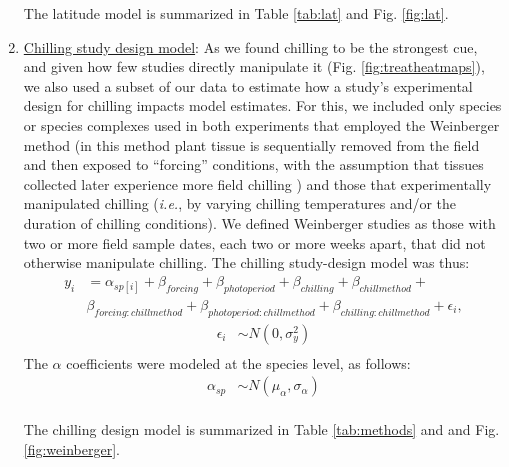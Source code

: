 \documentclass{article}
\begin{document}
\begin{enumerate}
\par The latitude model is summarized in Table \ref{tab:lat} and Fig. \ref{fig:lat}.
\item \underline{Chilling study design model}:
As we found chilling to be the strongest cue, and given how few studies directly manipulate it (Fig. \ref{fig:treatheatmaps}), we also used a subset of our data to estimate how a study's experimental design for chilling impacts model estimates. For this, we included only species or species complexes used in both experiments that employed the Weinberger method (in this method plant tissue is sequentially removed from the field and then exposed to ``forcing'' conditions, with the assumption that tissues collected later experience more field chilling \emph{\citep{weinberger1950}}) and those that experimentally manipulated chilling (\emph{i.e.}, by varying chilling temperatures and/or the duration of chilling conditions). We defined Weinberger studies as those with two or more field sample dates, each two or more weeks apart, that did not otherwise manipulate chilling. The chilling study-design model was thus:
\begin{align*}
y_i &= \alpha_{sp[i]} + \beta_{forcing} + \beta_{photoperiod} + \beta_{chilling} + \beta_{chillmethod} + \\ & \beta_{forcing:chillmethod} + \beta_{photoperiod:chillmethod} + \beta_{chilling:chillmethod} + \epsilon_{i},
\end{align*}
\begin{align*}
\epsilon_i & \sim N(0,\sigma^2_y) \\
\end{align*}
\noindent The $\alpha$ coefficients were modeled at the species level, as follows:
\begin{align*}
\alpha_{sp} & \sim N(\mu_{\alpha}, \sigma_{\alpha}) \\
\end{align*}
\par The chilling design model is summarized in Table \ref{tab:methods} and and Fig. \ref{fig:weinberger}.


\end{enumerate}
\end{document}
